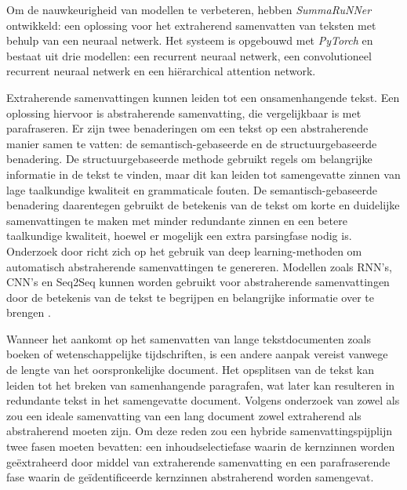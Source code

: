 \medspace

Om de nauwkeurigheid van modellen te verbeteren, hebben \textcite{Nallapati2017} \textit{SummaRuNNer} ontwikkeld: een oplossing voor het extraherend samenvatten van teksten met behulp van een neuraal netwerk. Het systeem is opgebouwd met \textit{PyTorch} en bestaat uit drie modellen: een recurrent neuraal netwerk, een convolutioneel recurrent neuraal netwerk en een hiërarchical attention network.

\medspace

Extraherende samenvattingen kunnen leiden tot een onsamenhangende tekst. Een oplossing hiervoor is abstraherende samenvatting, die vergelijkbaar is met parafraseren. Er zijn twee benaderingen om een tekst op een abstraherende manier samen te vatten: de semantisch-gebaseerde en de structuurgebaseerde benadering. De structuurgebaseerde methode gebruikt regels om belangrijke informatie in de tekst te vinden, maar dit kan leiden tot samengevatte zinnen van lage taalkundige kwaliteit en grammaticale fouten. De semantisch-gebaseerde benadering daarentegen gebruikt de betekenis van de tekst om korte en duidelijke samenvattingen te maken met minder redundante zinnen en een betere taalkundige kwaliteit, hoewel er mogelijk een extra parsingfase nodig is. Onderzoek door \textcite{Cao2022} richt zich op het gebruik van deep learning-methoden om automatisch abstraherende samenvattingen te genereren. Modellen zoals RNN's, CNN's en Seq2Seq kunnen worden gebruikt voor abstraherende samenvattingen door de betekenis van de tekst te begrijpen en belangrijke informatie over te brengen \autocite{Suleiman2020}.

\medspace

Wanneer het aankomt op het samenvatten van lange tekstdocumenten zoals boeken of wetenschappelijke tijdschriften, is een andere aanpak vereist vanwege de lengte van het oorspronkelijke document. Het opsplitsen van de tekst kan leiden tot het breken van samenhangende paragrafen, wat later kan resulteren in redundante tekst in het samengevatte document. Volgens onderzoek van zowel \textcite{Hsu2018} als \textcite{Huang2019} zou een ideale samenvatting van een lang document zowel extraherend als abstraherend moeten zijn. Om deze reden zou een hybride samenvattingspijplijn twee fasen moeten bevatten: een inhoudselectiefase waarin de kernzinnen worden geëxtraheerd door middel van extraherende samenvatting en een parafraserende fase waarin de geïdentificeerde kernzinnen abstraherend worden samengevat.

\medspace

